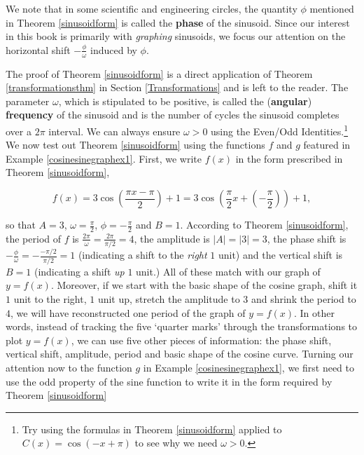 \smallskip

We note that in some scientific and engineering circles, the quantity $\phi$ mentioned in Theorem \ref{sinusoidform} is called the  \textbf{phase} of the sinusoid. Since our interest in this book is primarily with \textit{graphing} sinusoids, we focus our attention on the horizontal shift $-\frac{\phi}{\omega}$ induced by $\phi$.

\smallskip

The proof of Theorem \ref{sinusoidform}  is a direct application of Theorem \ref{transformationsthm} in Section \ref{Transformations} and is left to the reader.  The parameter $\omega$, which is stipulated to be positive, is called the (\textbf{angular}) \textbf{frequency}  of the sinusoid and is the number of cycles the sinusoid completes over a $2\pi$ interval.  We can always ensure $\omega > 0$ using the Even/Odd Identities.\footnote{Try using the formulas in Theorem \ref{sinusoidform} applied to $C(x) = \cos(-x+\pi)$ to see why we need $\omega > 0$.}  We now test out Theorem \ref{sinusoidform} using  the functions $f$ and $g$ featured  in Example \ref{cosinesinegraphex1}. First, we write $f(x)$ in the form prescribed in Theorem \ref{sinusoidform},

\[ f(x) =  3 \cos\left(\frac{\pi x - \pi}{2}\right) + 1 = 3\cos\left(\frac{\pi}{2} x + \left(-\frac{\pi}{2}\right)\right) + 1,\]

so that $A = 3$, $\omega = \frac{\pi}{2}$, $\phi = -\frac{\pi}{2}$ and $B = 1$.  According to Theorem \ref{sinusoidform}, the period of $f$ is $\frac{2\pi}{\omega} = \frac{2\pi}{\pi/2} = 4$, the amplitude is $|A| = |3| = 3$, the phase shift is $-\frac{\phi}{\omega} = -\frac{-\pi/2}{\pi/2} = 1$ (indicating a shift to the \textit{right} $1$ unit) and the vertical shift is $B = 1$ (indicating a shift \textit{up} $1$ unit.) All of these match with our graph of $y=f(x)$.  Moreover, if we start with the basic shape of the cosine graph, shift it $1$ unit to the right, $1$ unit up, stretch the amplitude to $3$ and shrink the period to $4$, we will have reconstructed one period of the graph of $y=f(x)$.  In other words, instead of tracking the five `quarter marks' through the transformations to plot $y=f(x)$, we can use five other pieces of information:  the phase shift, vertical shift, amplitude, period and basic shape of the cosine curve.   Turning our attention now to the function $g$ in Example \ref{cosinesinegraphex1}, we first need to use the odd property of the sine function to write it in the form required by Theorem \ref{sinusoidform}

